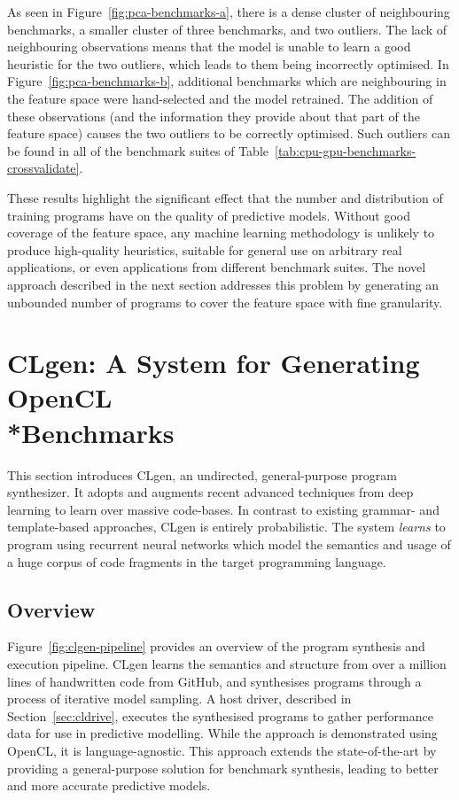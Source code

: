 As seen in Figure~\ref{fig:pca-benchmarks-a}, there is a dense cluster of neighbouring benchmarks, a smaller cluster of three benchmarks, and two outliers. The lack of neighbouring observations means that the model is unable to learn a good heuristic for the two outliers, which leads to them being incorrectly optimised. In Figure~\ref{fig:pca-benchmarks-b}, additional benchmarks which are neighbouring in the feature space were hand-selected and the model retrained. The addition of these observations (and the information they provide about that part of the feature space) causes the two outliers to be correctly optimised. Such outliers can be found in all of the benchmark suites of Table~\ref{tab:cpu-gpu-benchmarks-crossvalidate}.

These results highlight the significant effect that the number and distribution of training programs have on the quality of predictive models. Without good coverage of the feature space, any machine learning methodology is unlikely to produce high-quality heuristics, suitable for general use on arbitrary real applications, or even applications from different benchmark suites. The novel approach described in the next section addresses this problem by generating an unbounded number of programs to cover the feature space with fine granularity.


\section[CLgen: A System for Generating OpenCL Benchmarks]{CLgen: A System for Generating OpenCL\\*Benchmarks}
\label{sec:clgen}

This section introduces CLgen, an undirected, general-purpose program synthesizer. It adopts and augments recent advanced techniques from deep learning to learn over massive code-bases. In contrast to existing grammar- and template-based approaches, CLgen is entirely probabilistic. The system \emph{learns} to program using recurrent neural networks which model the semantics and usage of a huge corpus of code fragments in the target programming language.


\subsection{Overview}

Figure~\ref{fig:clgen-pipeline} provides an overview of the program synthesis and execution pipeline. CLgen learns the semantics and structure from over a million lines of handwritten code from GitHub, and synthesises programs through a process of iterative model sampling. A host driver, described in Section~\ref{sec:cldrive}, executes the synthesised programs to gather performance data for use in predictive modelling. While the approach is demonstrated using OpenCL, it is language-agnostic. This approach extends the state-of-the-art by providing a general-purpose solution for benchmark synthesis, leading to better and more accurate predictive models.

